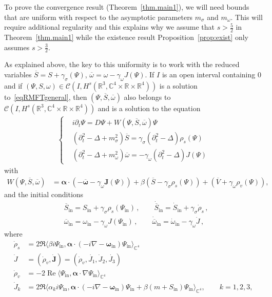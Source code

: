 \documentclass[AHL,Unicode,longabstracts,published]{cedram}
\DeclareMathOperator{\re}{Re}
\newcommand{\rmin}{\mathrm{in}}
\newcommand{\cC}{\mathcal{C}}
\newcommand\R{\mathbb{R}}
\newcommand\C{\mathbb{C}}
\renewcommand\bar{\overline}
\begin{document}
To prove the convergence result (Theorem~\ref{thm.main1}), we will need bounds that are uniform with respect to the asymptotic parameters $m_\sigma$ and $m_\omega$. This will require additional regularity and this explains why we assume that $s>\tfrac52$ in Theorem~\ref{thm.main1} while the existence result Proposition~\ref{prop:exist} only assumes $s>\tfrac32$.

As explained above, the key to this uniformity is to work with the reduced variables $\overline{S}=S+\gamma_\sigma(\Psi)$, $\overline{\omega}=\omega - \gamma_\omega J(\Psi)$. If $I$ is an open interval containing $0$ and if $(\Psi,S,\omega)\in\cC(I,H^s(\R^3,\C^4\times\R\times\R^4))$ is a solution to~\eqref{eqRMFTgeneral}, then $(\Psi,\bar{S},\bar{\omega})$ also belongs to $\cC(I,H^s(\R^3,\C^4\times\R\times\R^4))$ and is a solution to the equation
\begin{align}\label{eqRMFTgeneralchanged}
\begin{cases}
&i\partial_t \Psi=D \Psi + W(\Psi,\overline{S}, \overline{\omega}) \Psi \\
&\left(\partial_t^2-\Delta + m_\sigma^2\right)\overline{S} = \gamma_\sigma\left(\partial_t^2-\Delta\right)\rho_{s}(\Psi)\\
&\left(\partial_t^2-\Delta + m_\omega^2\right)\overline{\omega} = -\gamma_\omega\left(\partial_t^2-\Delta\right)J(\Psi)
\end{cases}
\end{align}
with
\begin{align}\label{eq:W-def}
W\left(\Psi,\overline{S}, \overline{\omega}\right)&= \bm \alpha \cdot \left(- \overline{\bm \omega}-\gamma_\omega{\bm J}(\Psi)\right) +\beta \left(\overline{S}-\gamma_\sigma\rho_s(\Psi)\right) +\left(\overline{V}+ \gamma_\omega\rho_v(\Psi)\right),
\end{align}
and the initial conditions
\begin{equation}\label{eq:init-red}
\begin{split}
&\overline{S}_\rmin=S_\rmin + \gamma_\sigma\rho_{s}(\Psi_\rmin)\,,
\qquad\dot{\overline{S}}_\rmin=\dot{S}_\rmin + \gamma_\sigma\dot\rho_{s}\,,
\\
&\overline{\omega}_\rmin=\omega_\rmin- \gamma_\omega J(\Psi_\rmin)\,,
\qquad \dot{\overline{\omega}}_\rmin=\dot{\omega}_\rmin- \gamma_\omega \dot{J}\,,
\end{split}
\end{equation}
where
\begin{equation}
\begin{split}
\dot\rho_{s} &=2\Re\big\langle \beta i\Psi_\rmin,\bm \alpha \cdot (-i\nabla - \bm \omega_\rmin)\Psi_\rmin\big\rangle_{\C^4} \\
\dot{J}&=\left(\dot \rho_v, \dot {\bm J}\right)=\left(\dot \rho_v, \dot {J_1},\dot {J}_2, \dot {J_3}\right) \\
\dot \rho_v &=- 2\re \langle \Psi_\rmin, {\bm \alpha}\cdot \nabla \Psi_\rmin\rangle_{\C^4} \\
\dot {J}_k&= 2\Re\big\langle\alpha_k i\Psi_\rmin,\bm \alpha \cdot (-i\nabla - \bm \omega_\rmin)\Psi_\rmin +\beta (m+S_\rmin)\Psi_\rmin\big\rangle_{\C^4}, \qquad k=1,2,3,
\end{split}
\end{equation}
\end{document}
